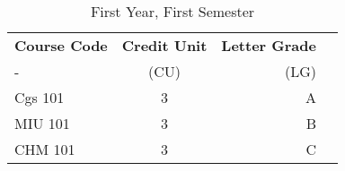\documentclass{article}
\begin{document}
 
\begin{table}[h!] 
	\begin{center} 
		\caption{First Year, First Semester} 
		\label{tab:tablel} 
		\begin{tabular}{l|c|r|c} 
			\textbf{Course Code} & \textbf{Credit Unit} & \textbf{Letter Grade}\\ 
			- & (CU) & (LG) \\ 
			\hline Cgs 101 & 3 & A\\
			 MIU 101 & 3 & B\\ 
			 CHM 101 & 3 & C\\ 
		 \end{tabular}
	  \end{center} 
	\end{table}
\end{document}

